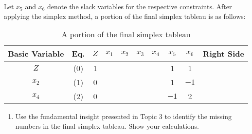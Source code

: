 \documentclass[a4paper]{article}
\begin{document}
\begin{enumerate}
Let $x_5$ and $x_6$ denote the slack variables for the respective constraints. After applying the simplex method, a portion of the final simplex tableau is as follows:
	\begin{table}[h]
	\centering
	\caption{A portion of the final simplex tableau}
	\label{tab5}
	\begin{tabular}{cccccccccc}
		\toprule[1.5pt]
		Basic Variable    &Eq.  &$Z$  &$x_1$&$x_2$&$x_3$&$x_4$&$x_5$&$x_6$&Right Side\\
		\midrule[0.5pt]
		$Z$     &(0)  &1  &      &       &       &       &1       &1       &\\
		$x_2$  &(1)  &0  &       &        &       &       &1       &$-1$       &\\
	    $x_4$  &(2)  &0  &       &      &      &       &$-1$      &2       &\\
		
		\bottomrule[1.5pt]
	\end{tabular}
\end{table}
\begin{enumerate}
	\item Use the fundamental insight presented in Topic 3 to identify the missing numbers in the final simplex tableau. Show your calculations.
	\begin{solution}
		

\end{solution}
\end{enumerate}
\end{enumerate}
\end{document}
